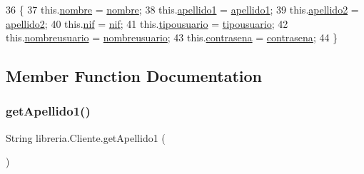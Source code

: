 \begin{DoxyCode}
36                                                                                                            
                                          \{
37         this.\mbox{\hyperlink{classlibreria_1_1_cliente_ab7862ac1d181becc7cf8a88ecf07b570}{nombre}} = \mbox{\hyperlink{classlibreria_1_1_cliente_ab7862ac1d181becc7cf8a88ecf07b570}{nombre}};
38         this.\mbox{\hyperlink{classlibreria_1_1_cliente_a9f1a869f9f8b0e14df73be50e636532e}{apellido1}} = \mbox{\hyperlink{classlibreria_1_1_cliente_a9f1a869f9f8b0e14df73be50e636532e}{apellido1}};
39         this.\mbox{\hyperlink{classlibreria_1_1_cliente_a9b97686667a729a4c0fd8b19d72b389a}{apellido2}} = \mbox{\hyperlink{classlibreria_1_1_cliente_a9b97686667a729a4c0fd8b19d72b389a}{apellido2}};
40         this.\mbox{\hyperlink{classlibreria_1_1_cliente_a6d50af0b6448c8ac66e9ae08c436cdfe}{nif}} = \mbox{\hyperlink{classlibreria_1_1_cliente_a6d50af0b6448c8ac66e9ae08c436cdfe}{nif}};
41         this.\mbox{\hyperlink{classlibreria_1_1_cliente_a7b289ea086987adbd145bf6dc8024e9e}{tipousuario}} = \mbox{\hyperlink{classlibreria_1_1_cliente_a7b289ea086987adbd145bf6dc8024e9e}{tipousuario}};
42         this.\mbox{\hyperlink{classlibreria_1_1_cliente_a3018645e586ef4b1abef3ac1a7f2a464}{nombreusuario}} = \mbox{\hyperlink{classlibreria_1_1_cliente_a3018645e586ef4b1abef3ac1a7f2a464}{nombreusuario}};
43         this.\mbox{\hyperlink{classlibreria_1_1_cliente_a0d80894cab7e9d1e3b531d29cf160737}{contrasena}} = \mbox{\hyperlink{classlibreria_1_1_cliente_a0d80894cab7e9d1e3b531d29cf160737}{contrasena}};
44     \}
\end{DoxyCode}


\subsection{Member Function Documentation}
\mbox{\label{classlibreria_1_1_cliente_a37166f7280771768679b29491274a82f}} 
\subsubsection{\texorpdfstring{get\+Apellido1()}{getApellido1()}}
{\footnotesize\ttfamily String libreria.\+Cliente.\+get\+Apellido1 (\begin{DoxyParamCaption}{ }\end{DoxyParamCaption})\hspace{0.3cm}{\ttfamily [inline]}}


